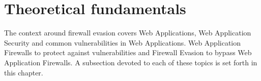 \section{Theoretical fundamentals}
\label{sec:fundamentals}
The context around firewall evasion covers Web Applications, Web Application Security and common vulnerabilities in Web Applications. Web Application Firewalls to protect against vulnerabilities and Firewall Evasion to bypass Web Application Firewalls.
A subsection devoted to each of these topics is set forth in this chapter.
